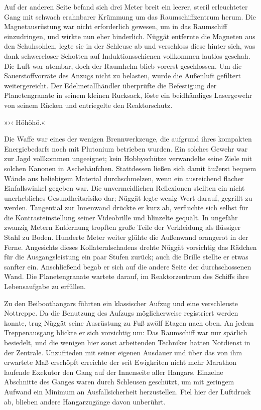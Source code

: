 Auf der anderen Seite befand sich drei Meter breit ein leerer, steril erleuchteter Gang mit schwach erahnbarer Krümmung um das Raumschiffzentrum herum. Die Magnetausrüstung war nicht erforderlich gewesen, um in das Raumschiff einzudringen, und wirkte nun eher hinderlich. Nüggät entfernte die Magneten aus den Schuhsohlen, legte sie in der Schleuse ab und verschloss diese hinter sich, was dank schwereloser Schotten auf Induktionsschienen vollkommen lautlos geschah. Die Luft war atembar, doch der Raumhelm blieb vorerst geschlossen. Um die Sauerstoffvorräte des Anzugs nicht zu belasten, wurde die Außenluft gefiltert weitergereicht. Der Edelmetallhändler überprüfte die Befestigung der Planetengranate in seinem kleinen Rucksack, löste ein beidhändiges Lasergewehr von seinem Rücken und entriegelte den Reaktorschutz.

»›‹ Höhöhö.«

Die Waffe war eines der wenigen Brennwerkzeuge, die aufgrund ihres kompakten Energiebedarfs noch mit Plutonium betrieben wurden. Ein solches Gewehr war zur Jagd vollkommen ungeeignet; kein Hobbyschütze verwandelte seine Ziele mit solchen Kanonen in Aschehäufchen. Stattdessen ließen sich damit äußerst bequem Wände aus beliebigem Material durchschmelzen, wenn ein ausreichend flacher Einfallswinkel gegeben war. Die unvermeidlichen Reflexionen stellten ein nicht unerhebliches Gesundheitsrisiko dar; Nüggät legte wenig Wert darauf, gegrillt zu werden. Tangential zur Innenwand drückte er kurz ab, verfluchte sich selbst für die Kontrasteinstellung seiner Videobrille und blinzelte gequält. In ungefähr zwanzig Metern Entfernung tropften große Teile der Verkleidung als flüssiger Stahl zu Boden. Hunderte Meter weiter glühte die Außenwand orangerot in der Ferne. Angesichts dieses Kollateralschadens drehte Nüggät vorsichtig das Rädchen für die Ausgangsleistung ein paar Stufen zurück; auch die Brille stellte er etwas sanfter ein. Anschließend begab er sich auf die andere Seite der durchschossenen Wand. Die Planetengranate wartete darauf, im Reaktorzentrum des Schiffs ihre Lebensaufgabe zu erfüllen.

Zu den Beiboothangars führten ein klassischer Aufzug und eine verschleuste Nottreppe. Da die Benutzung des Aufzugs möglicherweise registriert werden konnte, trug Nüggät seine Ausrüstung zu Fuß zwölf Etagen nach oben. An jedem Treppenausgang blickte er sich vorsichtig um: Das Raumschiff war nur spärlich besiedelt, und die wenigen hier sonst arbeitenden Techniker hatten Notdienst in der Zentrale. Unzufrieden mit seiner eigenen Ausdauer und über das von ihm erwartete Maß erschöpft erreichte der seit Ewigkeiten nicht mehr Marathon laufende Exekutor den Gang auf der Innenseite aller Hangars. Einzelne Abschnitte des Ganges waren durch Schleusen geschützt, um mit geringem Aufwand ein Minimum an Ausfallsicherheit herzustellen. Fiel hier der Luftdruck ab, blieben andere Hangarzugänge davon unberührt.

